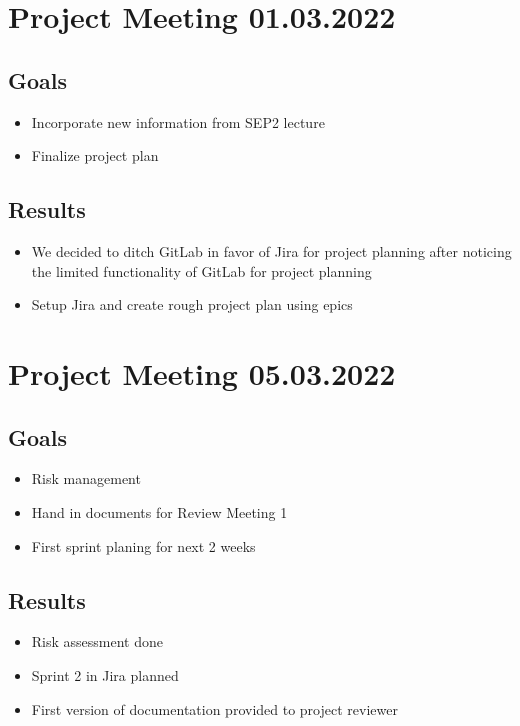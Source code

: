 \section{Project Meeting 01.03.2022}

\subsection{Goals}
\begin{itemize}
    \item Incorporate new information from SEP2 lecture
    \item Finalize project plan
\end{itemize}

\subsection{Results}
\begin{itemize}
    \item We decided to ditch GitLab in favor of Jira for project planning after noticing the limited functionality of GitLab for project planning
    \item Setup Jira and create rough project plan using epics
\end{itemize}

\section{Project Meeting 05.03.2022}

\subsection{Goals}
\begin{itemize}
    \item Risk management
    \item Hand in documents for Review Meeting 1
    \item First sprint planing for next 2 weeks
\end{itemize}

\subsection{Results}
\begin{itemize}
    \item Risk assessment done
    \item Sprint 2 in Jira planned
    \item First version of documentation provided to project reviewer
\end{itemize}

